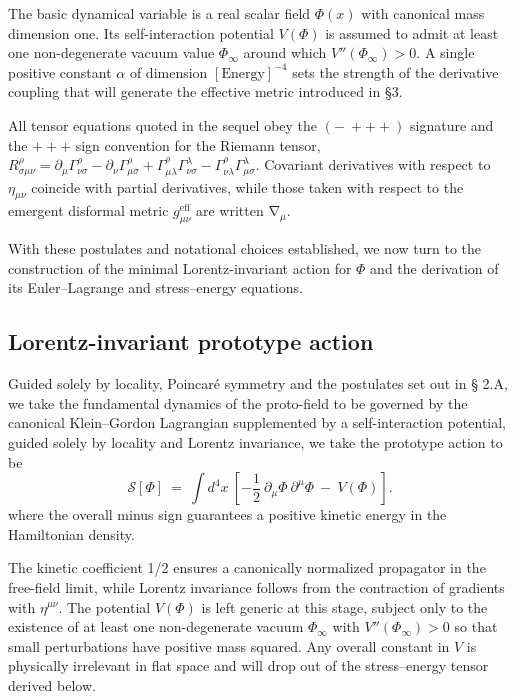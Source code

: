 \documentclass{iopjournal}
\begin{document}
The basic dynamical variable is a real scalar field $\Phi\left(x\right)$ with canonical mass dimension one. Its self-interaction potential $V\left(\Phi\right)$ is assumed to admit at least one non-degenerate vacuum value ${\Phi}_{\infty}$ around which $V''\left({\Phi}_{\infty}\right)>0$. A single positive constant $\alpha $ of dimension ${\left[\mathrm{Energy}\right]}^{-4}$ sets the strength of the derivative coupling that will generate the effective metric introduced in \S 3.

All tensor equations quoted in the sequel obey the $\left(-\ +++\right)$ signature and the $+++$ sign convention for the Riemann tensor,  $R^{\rho }_{\sigma \mu \nu }={\partial }_{\mu }{\Gamma}^{\rho }_{\nu \sigma }-{\partial }_{\nu }{\Gamma}^{\rho }_{\mu \sigma }+{\Gamma}^{\rho }_{\mu \lambda }{\Gamma}^{\lambda }_{\nu \sigma }-{\Gamma}^{\rho }_{\nu \lambda }{\Gamma}^{\lambda }_{\mu \sigma }$. Covariant derivatives with respect to ${\eta }_{\mu \nu }$ coincide with partial derivatives, while those taken with respect to the emergent disformal metric $g^{\mathrm{eff}}_{\mu \nu }$ are written ${\mathrm{\nabla }}_{\mu }$.

With these postulates and notational choices established, we now turn to the construction of the minimal Lorentz-invariant action for $\Phi$ and the derivation of its Euler--Lagrange and stress--energy equations.


\subsection{Lorentz-invariant prototype action}

Guided solely by locality, Poincar\'{e} symmetry and the postulates set out in {\S} 2.A, we take the fundamental dynamics of the proto-field to be governed by the canonical Klein--Gordon Lagrangian supplemented by a self-interaction potential, guided solely by locality and Lorentz invariance, we take the prototype action to be
\begin{equation}\label{eq2.1}
\mathcal{S}\left[\Phi\right]\ =\ \int{d^4}x\ \left[-\frac{1}{2}\ {\partial }_{\mu }\Phi\ {\partial }^{\mu }\Phi\ -\ V\left(\Phi\right)\right].
\end{equation}
where the overall minus sign guarantees a positive kinetic energy in the Hamiltonian density.

The kinetic coefficient 1/2 ensures a canonically normalized propagator in the free-field limit, while Lorentz invariance follows from the contraction of gradients with $\eta^{\mu\nu}$. The potential $V(\Phi)$ is left generic at this stage, subject only to the existence of at least one non-degenerate vacuum $\Phi_{\infty}$ with $V''(\Phi_{\infty}){>}0$ so that small perturbations have positive mass squared. Any overall constant in $V$ is physically irrelevant in flat space and will drop out of the stress--energy tensor derived below.
\end{document}
